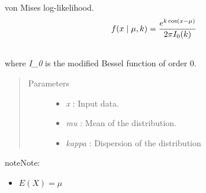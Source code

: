 \documentclass[letterpaper,10pt,english]{sphinxmanual}
\begin{document}
\begin{fulllineitems}
\label{distributions:pymc.distributions.von_mises_like}
von Mises log-likelihood.
\begin{gather}
\begin{split}f(x \mid \mu, k) = \frac{e^{k \cos(x - \mu)}}{2 \pi I_0(k)}\end{split}\notag\\\begin{split}\end{split}\notag
\end{gather}
where \emph{I\_0} is the modified Bessel function of order 0.
\begin{quote}\begin{description}
\item[{Parameters }] \leavevmode\begin{itemize}
\item {} 
\emph{x} : Input data.

\item {} 
\emph{mu} : Mean of the distribution.

\item {} 
\emph{kappa} : Dispersion of the distribution

\end{itemize}

\end{description}\end{quote}

\begin{notice}{note}{Note:}\begin{itemize}
\item {} 
$E(X) = \mu$

\end{itemize}
\end{notice}

\end{fulllineitems}

\end{document}
